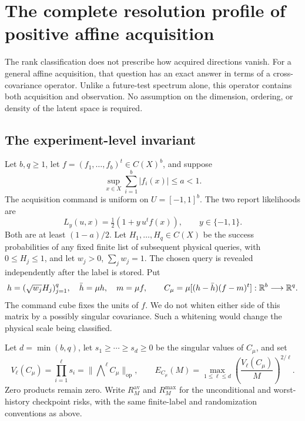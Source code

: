 \section{The complete resolution profile of positive affine acquisition}
\label{sec:v18-affine}
The rank classification does not prescribe how acquired directions
vanish. For a general affine acquisition, that question has an exact
answer in terms of a cross-covariance operator. Unlike a future-test
spectrum alone, this operator contains both acquisition and observation.
No assumption on the dimension, ordering, or density of the latent
space is required.

\subsection{The experiment-level invariant}
Let $b,q\ge1$, let $f=(f_1,\ldots,f_b)^t\in C(X)^b$, and suppose
\begin{equation}\label{eq:v18-affine-bound}
 \sup_{x\in X}\sum_{i=1}^b|f_i(x)|\le a<1.
\end{equation}
The acquisition command is uniform on $U=[-1,1]^b$. The two report
likelihoods are
\begin{equation}\label{eq:v18-affine-likelihood}
 L_y(u,x)=\tfrac12(1+y\,u^tf(x)),\qquad y\in\{-1,1\}.
\end{equation}
Both are at least $(1-a)/2$. Let $H_1,\ldots,H_q\in C(X)$ be the
success probabilities of any fixed finite list of subsequent physical
queries, with $0\le H_j\le1$, and let $w_j>0$, $\sum_jw_j=1$.
The chosen query is revealed independently after the label is stored.
Put
\begin{equation}\label{eq:v18-covariance}
 h=(\sqrt{w_j}H_j)_{j=1}^q,\quad \bar h=\mu h,\quad m=\mu f,
 \qquad C_\mu=\mu[(h-\bar h)(f-m)^t]:\mathbb R^b\longrightarrow\mathbb R^q.
\end{equation}
The command cube fixes the units of $f$. We do not whiten either side
of this matrix by a possibly singular covariance. Such a whitening
would change the physical scale being classified.

Let $d=\min(b,q)$, let $s_1\ge\cdots\ge s_d\ge0$ be the singular
values of $C_\mu$, and set
\begin{equation}\label{eq:v18-affine-profile}
 V_\ell(C_\mu)=\prod_{i=1}^\ell s_i
             =\|\mathop{\bigwedge}\nolimits^\ell C_\mu\|_{\mathrm{op}},
 \qquad
 E_{C_\mu}(M)=\max_{1\le\ell\le d}
           \left(\frac{V_\ell(C_\mu)}{M}\right)^{2/\ell}.
\end{equation}
Zero products remain zero. Write $R^{\mathrm{av}}_M$ and
$R^{\mathrm{max}}_M$ for the unconditional and worst-history checkpoint
risks, with the same finite-label and randomization conventions as above.

